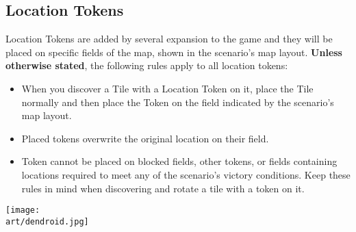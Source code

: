 \begin{multicols*}{2}
\subsection*{Location Tokens}
Location Tokens are added by several expansion to the game and they will be placed on specific fields of the map, shown in the scenario's map layout. \textbf{Unless otherwise stated}, the following rules apply to all location tokens:
\begin{itemize}
  \item When you discover a Tile with a Location Token on it, place the Tile normally and then place the Token on the field indicated by the scenario's map layout.
  \item Placed tokens overwrite the original location on their field.
  \item Token cannot be placed on blocked fields, other tokens, or fields containing locations required to meet any of the scenario's victory conditions. Keep these rules in mind when discovering and rotate a tile with a token on it.
\end{itemize}
\vspace*{\fill}

\begin{center}
  \texttt{[image: \\art/dendroid.jpg]}
\end{center}

\end{multicols*}
